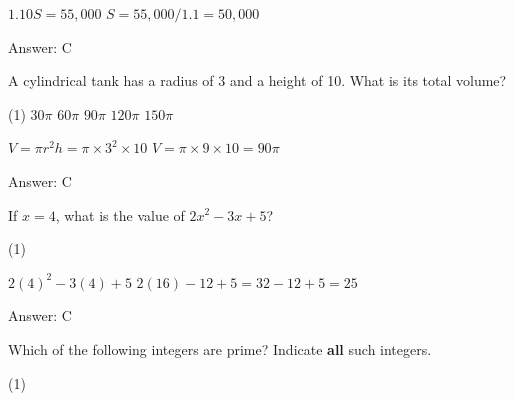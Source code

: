 \documentclass[11pt,paper=a4,answers]{exam}
\begin{document}
\begin{questions}
\begin{solution}
\begin{center}
$1.10S = 55,000$
\vspace{5pt}
$S = 55,000 / 1.1 = 50,000$
\end{center}

Answer: \colorbox{yellow!100}{C}
\end{solution}

\vspace{1cm}

\question
A cylindrical tank has a radius of 3 and a height of 10. What is its total volume?

\begin{tasks}(1)
\task[A)] $30\pi$ \task[B)] $60\pi$ \task[C)] $90\pi$ \task[D)] $120\pi$ \task[E)] $150\pi$
\end{tasks}

\begin{solution}
\begin{center}
$V = \pi r^2 h = \pi \times 3^2 \times 10$
\vspace{5pt}
$V = \pi \times 9 \times 10 = 90\pi$
\end{center}

Answer: \colorbox{yellow!100}{C}
\end{solution}

\vspace{1cm}

\question
If $x = 4$, what is the value of $2x^2 - 3x + 5$?

\begin{tasks}(1)
    
\end{tasks}

\begin{solution}
\begin{center}
$2(4)^2 - 3(4) + 5$
\vspace{5pt}
$2(16) - 12 + 5 = 32 - 12 + 5 = 25$
\end{center}

Answer: \colorbox{yellow!100}{C}
\end{solution}

\vspace{1cm}


\question
Which of the following integers are prime?
Indicate \textbf{all} such integers.

\begin{tasks}(1)
\end{tasks}


\end{questions}
\end{document}
